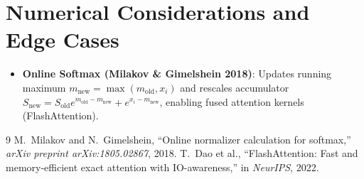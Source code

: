 \documentclass[11pt,a4paper]{article}
\theoremstyle{definition}
\begin{document}
\section{Numerical Considerations and Edge Cases}

\begin{itemize}
    \item \textbf{Online Softmax (Milakov & Gimelshein 2018)}: Updates running maximum $m_{\text{new}} = \max(m_{\text{old}}, x_i)$ and rescales accumulator $S_{\text{new}} = S_{\text{old}} e^{m_{\text{old}} - m_{\text{new}}} + e^{x_i - m_{\text{new}}}$, enabling fused attention kernels (FlashAttention).
\end{itemize}

\begin{thebibliography}{9}
 M.~Milakov and N.~Gimelshein, ``Online normalizer calculation for softmax,'' \emph{arXiv preprint arXiv:1805.02867}, 2018.
 T.~Dao et al., ``FlashAttention: Fast and memory-efficient exact attention with IO-awareness,'' in \emph{NeurIPS}, 2022.
\end{thebibliography}
\end{document}
